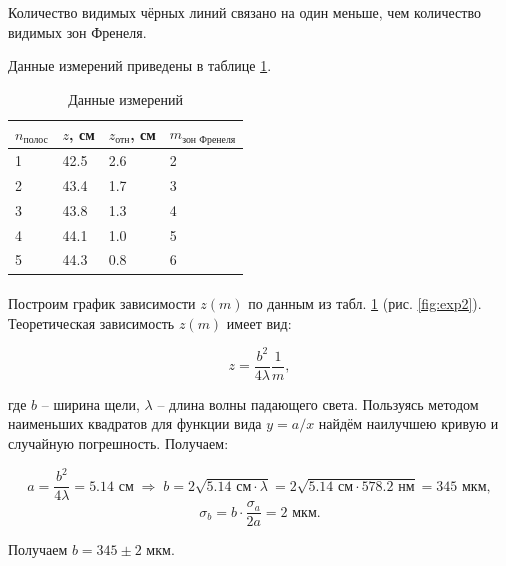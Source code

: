 \documentclass[a4paper,12pt]{article} %
\begin{document}
Количество видимых чёрных линий связано на один меньше, чем количество видимых зон Френеля.

Данные измерений приведены в таблице \ref{tab:exp1}.

\begin{table}[h]
\centering
\begin{tabular}{|l|l|l|l|}
\hline
$n_\text{полос}$ & $z$, см & $z_\text{отн}$, см & $m_\text{зон Френеля}$ \\ \hline
1                & 42.5    & 2.6                & 2                      \\ \hline
2                & 43.4    & 1.7                & 3                      \\ \hline
3                & 43.8    & 1.3                & 4                      \\ \hline
4                & 44.1    & 1.0                & 5                      \\ \hline
5                & 44.3    & 0.8                & 6                      \\ \hline
\end{tabular}
\caption{Данные измерений}
\label{tab:exp1}
\end{table}

\paragraph{} Построим график зависимости $z(m)$ по данным из табл. \ref{tab:exp1} (рис. \ref{fig:exp2}). Теоретическая зависимость $z(m)$ имеет вид:

\[
z = \frac{b^2}{4\lambda} \frac{1}{m},
\]

\noindent где $b$ -- ширина щели, $\lambda$ -- длина волны падающего света. Пользуясь методом наименьших квадратов для функции вида $y = a/x$ найдём наилучшею кривую и случайную погрешность. Получаем:

\[ 
a = \frac{b^2}{4 \lambda} = 5.14 \text{ см} \; \Rightarrow \; b = 2\sqrt{5.14 \text{ см} \cdot \lambda} = 2 \sqrt{5.14 \text{ см} \cdot 578.2 \text{ нм}} = 345 \text{ мкм},
\]\[
\sigma_b = b \cdot \frac{\sigma_a}{2a} = 2 \text{ мкм}.
\]

\noindent Получаем $b = 345 \pm 2$ мкм.
\end{document}
